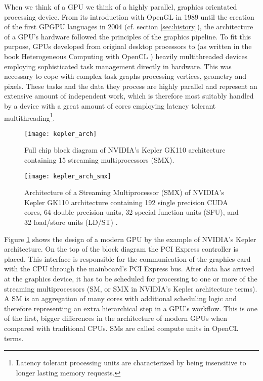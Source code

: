 When we think of a GPU we think of a highly parallel, graphics orientated processing device. From its introduction with OpenGL in 1989 until the creation of the first GPGPU languages in 2004 (cf. section \ref{sec:history}), the architecture of a GPU's hardware followed the principles of the graphics pipeline. To fit this purpose, GPUs developed from original desktop processors to (as written in the book Heterogeneous Computing with OpenCL \cite{opencl_book}) heavily multithreaded devices employing sophisticated task management directly in hardware. This was necessary to cope with complex task graphs processing vertices, geometry and pixels. These tasks and the data they process are highly parallel and represent an extensive amount of independent work, which is therefore most suitably handled by a device with a great amount of cores employing latency tolerant multithreading\footnote{Latency tolerant processing units are characterized by being insensitive to longer lasting memory requests.}.

\begin{figure}[h]
\centering
\texttt{[image: kepler\_arch]}
\caption{Full chip block diagram of NVIDIA's Kepler GK110 architecture containing 15 streaming multiprocessors (SMX). \cite{kepler_arch}}
\label{fig:kepler_arch}
\end{figure}

\begin{figure}
\centering
\texttt{[image: kepler\_arch\_smx]}
\caption{Architecture of a Streaming Multiprocessor (SMX) of NVIDIA's Kepler GK110 architecture containing 192 single precision CUDA cores, 64 double precision units, 32 special function units (SFU), and 32 load/store units (LD/ST) \cite{kepler_arch}.}
\label{fig:kepler_arch_smx}
\end{figure}

Figure \ref{fig:kepler_arch} shows the design of a modern GPU by the example of NVIDIA's Kepler architecture. On the top of the block diagram the PCI Express controller is placed. This interface is responsible for the communication of the graphics card with the CPU through the mainboard's PCI Express bus. After data has arrived at the graphics device, it has to be scheduled for processing to one or more of the streaming multiprocessors (SM, or SMX in NVIDIA's Kepler architecture terms). A SM is an aggregation of many cores with additional scheduling logic and therefore representing an extra hierarchical step in a GPU's workflow. This is one of the first, bigger differences in the architecture of modern GPUs when compared with traditional CPUs. SMs are called compute units in OpenCL terms.

